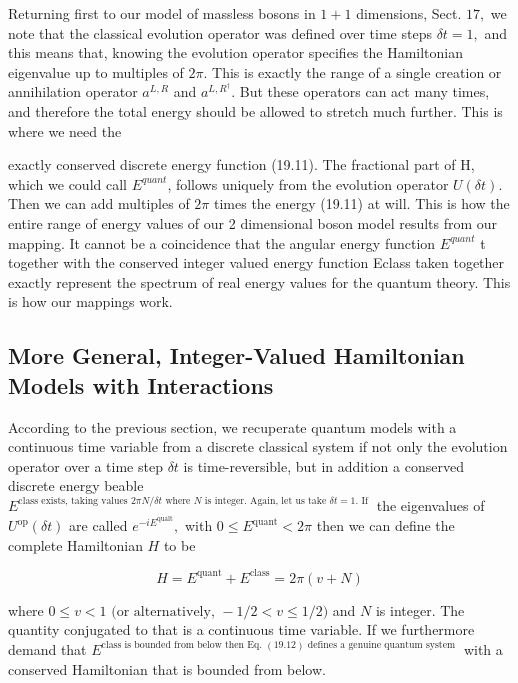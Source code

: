 \documentclass[main.tex]{subfiles}
\begin{document}
Returning first to our model of massless bosons in $1+1$ dimensions, Sect. $17,$ we note that the classical evolution operator was defined over time steps $\delta t=1,$ and this means that, knowing the evolution operator specifies the Hamiltonian eigenvalue up to multiples of $2 \pi .$ This is exactly the range of a single creation or annihilation operator $a^{L, R}$ and $a^{L, R^{\dagger}} .$ But these operators can act many times, and therefore the total energy should be allowed to stretch much further. This is where we need the

exactly conserved discrete energy function (19.11). The fractional part of H, which
we could call $E^{quant}$, follows uniquely from the evolution operator $U(\delta t)$. Then we
can add multiples of $2\pi$ times the energy (19.11) at will. This is how the entire
range of energy values of our 2 dimensional boson model results from our mapping.
It cannot be a coincidence that the angular energy function $E^{quant}$ t together with the
conserved integer valued energy function Eclass taken together exactly represent the
spectrum of real energy values for the quantum theory. This is how our mappings
work.




\subsection{More General, Integer-Valued Hamiltonian Models with Interactions}\label{ch19.4}

According to the previous section, we recuperate quantum models with a continuous time variable from a discrete classical system if not only the evolution operator over a time step $\delta t$ is time-reversible, but in addition a conserved discrete energy beable $E^{\text {class exists, taking values } 2 \pi N / \delta t \text { where } N \text { is integer. Again, let us take } \delta t=1 . \text { If }}$ the eigenvalues of $U^{\mathrm{op}}(\delta t)$ are called $e^{-i E^{\mathrm{qualt}}},$ with $0 \leq E^{\mathrm{quant}}<2 \pi$ then we can define the complete Hamiltonian $H$ to be

$$
H=E^{\mathrm{quant}}+E^{\mathrm{class}}=2 \pi(v+N)
$$

where $0 \leq v<1 \text { (or alternatively, }-1 / 2<v \leq 1 / 2)$ and $N$ is integer. The quantity conjugated to that is a continuous time variable. If we furthermore demand that $E^{\text {class is bounded from below then Eq. }(19.12) \text { defines a genuine quantum system }}$ with a conserved Hamiltonian that is bounded from below.
\end{document}
